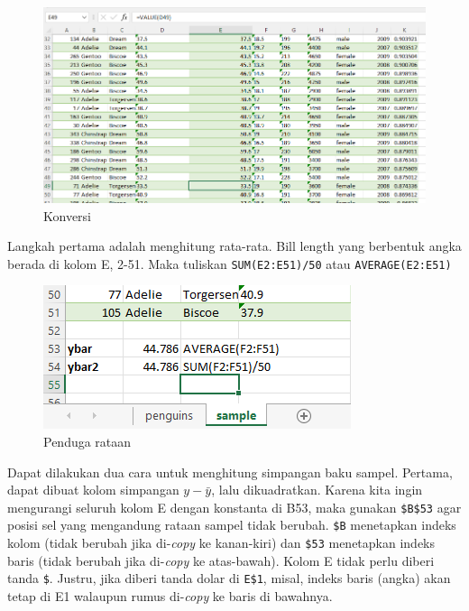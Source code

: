\documentclass[
  letterpaper,
  DIV=11,
  numbers=noendperiod]{scrreprt}
\begin{document}
\begin{figure}

{\centering \includegraphics{./count-2.png}

}

\caption{Konversi}

\end{figure}

Langkah pertama adalah menghitung rata-rata. Bill length yang berbentuk
angka berada di kolom E, 2-51. Maka tuliskan \texttt{SUM(E2:E51)/50}
atau \texttt{AVERAGE(E2:E51)}

\begin{figure}

{\centering \includegraphics{./count-3.png}

}

\caption{Penduga rataan}

\end{figure}

Dapat dilakukan dua cara untuk menghitung simpangan baku sampel.
Pertama, dapat dibuat kolom simpangan \(y-\bar{y}\), lalu dikuadratkan.
Karena kita ingin mengurangi seluruh kolom E dengan konstanta di B53,
maka gunakan \texttt{\$B\$53} agar posisi sel yang mengandung rataan
sampel tidak berubah. \texttt{\$B} menetapkan indeks kolom (tidak
berubah jika di-\emph{copy} ke kanan-kiri) dan \texttt{\$53} menetapkan
indeks baris (tidak berubah jika di-\emph{copy} ke atas-bawah). Kolom E
tidak perlu diberi tanda \texttt{\$}. Justru, jika diberi tanda dolar di
\texttt{E\$1}, misal, indeks baris (angka) akan tetap di E1 walaupun
rumus di-\emph{copy} ke baris di bawahnya.
\end{document}
